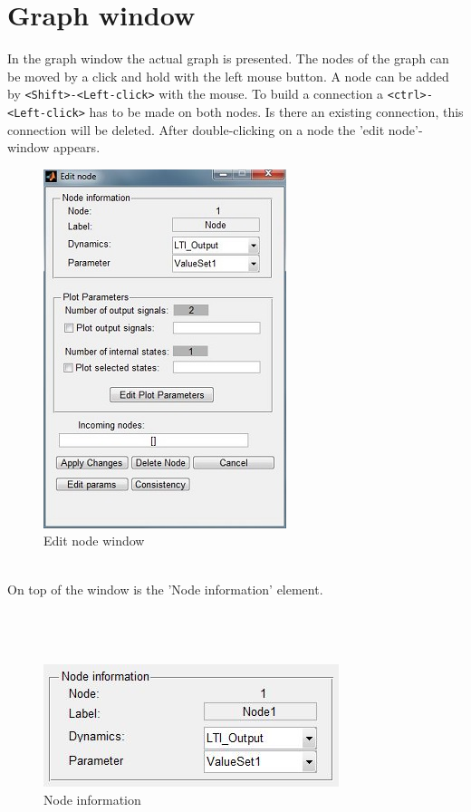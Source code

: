 \documentclass[12pt]{report}
\begin{document}
\section{Graph window}
\label{sec:graphwin}
In the graph window the actual graph is presented. The nodes of the graph can be moved by a click and hold with the left mouse button. A node can be added by \texttt{<Shift>-<Left-click>} with the mouse. To build a connection a \texttt{<ctrl>-<Left-click>} has to be made on both nodes. Is there an existing connection, this connection will be deleted. After double-clicking on a node the 'edit node'-window appears.\\
\begin{figure}[h]
\centering
\includegraphics[scale=.8]{editnodea}
\caption{Edit node window}
\label{FIG:abb24}
\end{figure}
\\
On top of the window is the 'Node information' element.\\
\\
\\
\\
\begin{figure}[h]
\centering
\includegraphics[scale=.8]{nodeinfo}
\caption{Node information}
\label{FIG:abb25}
\end{figure}
\end{document}

